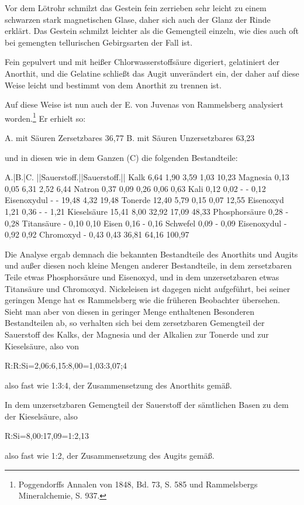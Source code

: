\documentclass[a4paper, 11pt, oneside]{article}
\begin{document}
Vor dem Lötrohr schmilzt das Gestein fein zerrieben sehr leicht zu einem schwarzen stark magnetischen Glase, daher sich auch der Glanz der Rinde erklärt. Das Gestein schmilzt leichter als die Gemengteil einzeln, wie dies auch oft bei gemengten tellurischen Gebirgsarten der Fall ist.

Fein gepulvert und mit heißer Chlorwasserstoffsäure digeriert, gelatiniert der Anorthit, und die Gelatine schließt das Augit unverändert ein, der daher auf diese Weise leicht und bestimmt von dem Anorthit zu trennen ist.

Auf diese Weise ist nun auch der E. von Juvenas von Rammelsberg analysiert worden.\footnote{Poggendorffs Annalen von 1848, Bd. 73, S. 585 und Rammelsbergs Mineralchemie, S. 937.} Er erhielt so:

A. mit Säuren Zersetzbares 36,77
B. mit Säuren Unzersetzbares 63,23

und in diesen wie in dem Ganzen (C) die folgenden Bestandteile:

A.|B.|C.  
||Sauerstoff.||Sauerstoff.||  
Kalk 6,64 1,90 3,59 1,03 10,23  
Magnesia 0,13 0,05 6,31 2,52 6,44  
Natron 0,37 0,09 0,26 0,06 0,63  
Kali 0,12 0,02 - - 0,12  
Eisenoxydul - - 19,48 4,32 19,48  
Tonerde 12,40 5,79 0,15 0,07 12,55  
Eisenoxyd 1,21 0,36 - - 1,21  
Kieselsäure 15,41 8,00 32,92 17,09 48,33  
Phosphorsäure 0,28 - 0,28  
Titansäure - 0,10 0,10  
Eisen 0,16 - 0,16  
Schwefel 0,09 - 0,09  
Eisenoxydul - 0,92 0,92  
Chromoxyd - 0,43 0,43  
36,81 64,16 100,97  

Die Analyse ergab demnach die bekannten Bestandteile des Anorthits und Augits und außer diesen noch kleine Mengen anderer Bestandteile, in dem zersetzbaren Teile etwas Phosphorsäure und Eisenoxyd, und in dem unzersetzbaren etwas Titansäure und Chromoxyd. Nickeleisen ist dagegen nicht aufgeführt, bei seiner geringen Menge hat es Rammelsberg wie die früheren Beobachter übersehen. Sieht man aber von diesen in geringer Menge enthaltenen Besonderen Bestandteilen ab, so verhalten sich bei dem zersetzbaren Gemengteil der Sauerstoff des Kalks, der Magnesia und der Alkalien zur Tonerde und zur Kieselsäure, also von

R:R:Si=2,06:6,15:8,00=1,03:3,07;4

also fast wie 1:3:4, der Zusammensetzung des Anorthits gemäß.

In dem unzersetzbaren Gemengteil der Sauerstoff der sämtlichen Basen zu dem der Kieselsäure, also

R:Si=8,00:17,09=1:2,13

also fast wie 1:2, der Zusammensetzung des Augits gemäß.
\end{document}
